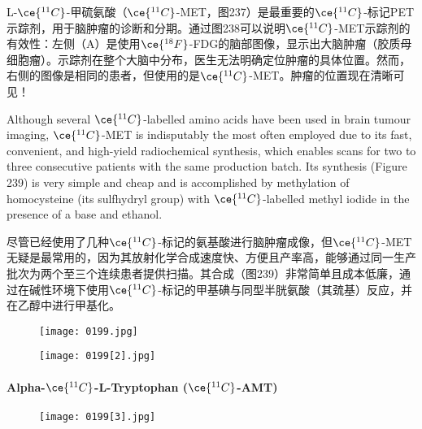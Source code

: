 \documentclass[dvipsnames, svgnames,a4paper,11pt]{article}
\begin{document}
L-\(\ce{^{11}C}\)-甲硫氨酸（\(\ce{^{11}C}\)-MET，图237）是最重要的\(\ce{^{11}C}\)-标记PET示踪剂，用于脑肿瘤的诊断和分期。通过图238可以说明\(\ce{^{11}C}\)-MET示踪剂的有效性：左侧（A）是使用\(\ce{^{18}F}\)-FDG的脑部图像，显示出大脑肿瘤（胶质母细胞瘤）。示踪剂在整个大脑中分布，医生无法明确定位肿瘤的具体位置。然而，右侧的图像是相同的患者，但使用的是\(\ce{^{11}C}\)-MET。肿瘤的位置现在清晰可见！

Although several \(\ce{^{11}C}\)-labelled amino acids have been used in brain tumour imaging, \(\ce{^{11}C}\)-MET is indisputably the most often employed due to its fast, convenient, and high-yield radiochemical synthesis, which enables scans for two to three consecutive patients with the same production batch. Its synthesis (Figure 239) is very simple and cheap and is accomplished by methylation of homocysteine (its sulfhydryl group) with \(\ce{^{11}C}\)-labelled methyl iodide in the presence of a base and ethanol.

尽管已经使用了几种\(\ce{^{11}C}\)-标记的氨基酸进行脑肿瘤成像，但\(\ce{^{11}C}\)-MET无疑是最常用的，因为其放射化学合成速度快、方便且产率高，能够通过同一生产批次为两个至三个连续患者提供扫描。其合成（图239）非常简单且成本低廉，通过在碱性环境下使用\(\ce{^{11}C}\)-标记的甲基碘与同型半胱氨酸（其巯基）反应，并在乙醇中进行甲基化。

\begin{figure}[h]
	\centering
    \texttt{[image: 0199.jpg]}  
     \label{fig238}
\end{figure}

\begin{figure}[h]
	\centering
    \texttt{[image: 0199[2].jpg]}  
     \label{fig239}
\end{figure}



\paragraph{Alpha-\(\ce{^{11}C}\)-L-Tryptophan (\(\ce{^{11}C}\)-AMT) }

\begin{wrapfigure}{r}{0.4\textwidth}
    \centering
    \texttt{[image: 0199[3].jpg]}
     \label{fig240}
\end{wrapfigure}
\end{document}
